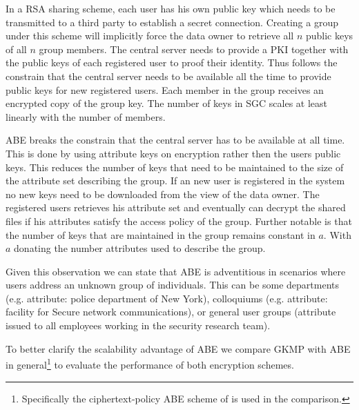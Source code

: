 In a \ac{RSA} sharing scheme, each user has his own public key which needs to be transmitted to a third party to establish a secret connection. Creating a group under this scheme will implicitly force the data owner to retrieve all $n$ public keys of all $n$ group members. The central server needs to provide a \ac{PKI} together with the public keys of each registered user to proof their identity. Thus follows the constrain that the central server needs to be available all the time to provide public keys for new registered users. Each member in the group receives an encrypted copy of the group key. The number of keys in \ac{SGC} scales at least linearly with the number of members. 

\ac{ABE} breaks the constrain that the central server has to be available at all time. This is done by using attribute keys on encryption rather then the users public keys. This reduces the number of keys that need to be maintained to the size of the attribute set describing the group. If an new user is registered in the system no new keys need to be downloaded from the view of the data owner. The registered users retrieves his attribute set and eventually can decrypt the shared files if his attributes satisfy the access policy of the group. Further notable is that the number of keys that are maintained in the group remains constant in $a$. With $a$ donating the number attributes used to describe the group. 

Given this observation we can state that \ac{ABE} is adventitious in scenarios where users address an unknown group of individuals. This can be some departments (e.g. attribute: police department of New York), colloquiums (e.g. attribute: facility for Secure network communications), or general user groups (attribute issued to all employees working in the security research team).

To better clarify the scalability advantage of \ac{ABE} we compare GKMP with ABE in general\footnote{Specifically the ciphertext-policy ABE scheme of \cite{bethencourt2007ciphertext} is used in the comparison.} to evaluate the performance of both encryption schemes.

